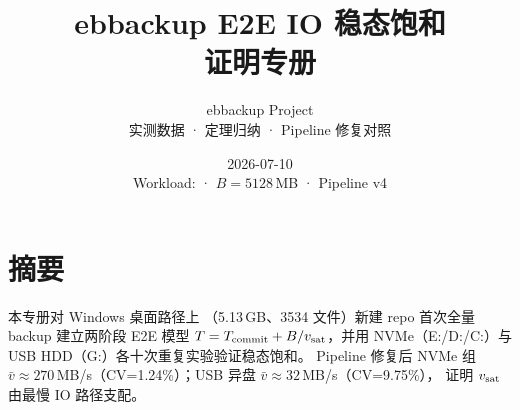 \documentclass[12pt,a4paper,openany]{ctexbook}
\title{ebbackup E2E IO 稳态饱和\\[0.3em]\large 证明专册}
\author{ebbackup Project\\实测数据 · 定理归纳 · Pipeline 修复对照}
\date{2026-07-10\\{\small Workload: \filepath{D:\textbackslash CUDA} · $B=5128$\,MB · Pipeline v4}}
\begin{document}
\frontmatter
\maketitle
\chapter*{摘要}
本专册对 Windows 桌面路径上 （5.13\,GB、3534 文件）新建 repo 首次全量 backup
建立两阶段 E2E 模型 $T=T_{\mathrm{commit}}+B/v_{\mathrm{sat}}$，并用 NVMe（E:/D:/C:）与 USB HDD（G:）各十次重复实验验证稳态饱和。
Pipeline 修复后 NVMe 组 $\bar{v}\approx 270$\,MB/s（CV=1.24\%）；USB 异盘 $\bar{v}\approx 32$\,MB/s（CV=9.75\%），
证明 $v_{\mathrm{sat}}$ 由最慢 IO 路径支配。
\tableofcontents
\listoffigures
\listoftables

\mainmatter






\appendix


\backmatter
\end{document}
